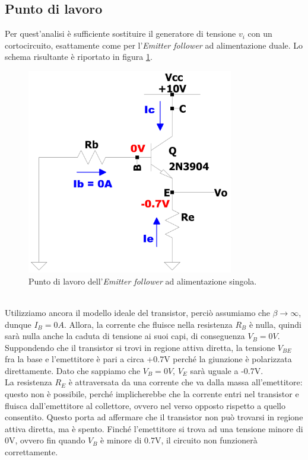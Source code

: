 \documentclass{report}
\begin{document}
\subsection{Punto di lavoro} %
Per quest'analisi è sufficiente sostituire il generatore di tensione $v_i$ con un cortocircuito, esattamente come per l'\textit{Emitter follower} ad alimentazione duale. Lo schema risultante è riportato in figura \ref{figura:EFv2_1_pl}.
\begin{figure}[h]
\centering
\includegraphics[height=9cm]{immagini/EFv2_1_pl}
\caption{Punto di lavoro dell'\textit{Emitter follower} ad alimentazione singola.}
\label{figura:EFv2_1_pl}
\end{figure}
\\Utilizziamo ancora il modello ideale del transistor, perciò assumiamo che $\displaystyle{\beta\rightarrow\infty}$, dunque $I_{B}=0A$. Allora, la corrente che fluisce nella resistenza  $R_B$ è nulla, quindi sarà nulla anche la caduta di tensione ai suoi capi, di conseguenza $V_B=0V$.
\\\indent Suppondendo che il transistor si trovi in regione attiva diretta, la tensione $V_{BE}$ fra la base e l'emettitore è pari a circa +0.7V perché la giunzione è polarizzata direttamente. Dato che sappiamo che $V_{B}=0V$, $V_{E}$ sarà uguale a -0.7V. 
\\\indent La resistenza $R_E$ è attraversata da una corrente che va dalla massa all'emettitore: questo non è possibile, perché implicherebbe che la corrente entri nel transistor e fluisca dall'emettitore al collettore, ovvero nel verso opposto rispetto a quello consentito. Questo porta ad affermare che il transistor non può trovarsi in regione attiva diretta, ma è spento. Finché l'emettitore si trova ad una tensione minore di 0V, ovvero fin quando $V_B$ è minore di 0.7V, il circuito non funzionerà correttamente.
\end{document}
